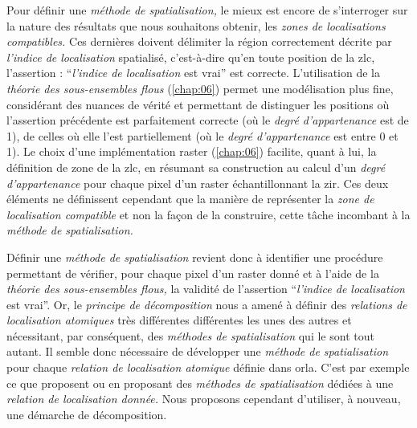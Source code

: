 Pour définir une \emph{méthode de spatialisation,} le mieux est encore
de s’interroger sur la nature des résultats que nous souhaitons
obtenir, les \emph{zones de localisations compatibles.} Ces dernières
doivent délimiter la région correctement décrite par \emph{l'indice de
  localisation} spatialisé, c'est-à-dire qu'en toute position de la
\ac{zlc}, l'assertion : \enquote{\emph{l'indice de localisation} est
  vrai} est correcte. L'utilisation de la \emph{théorie des
  sous-ensembles flous} (\autoref{chap:06}) permet une modélisation
plus fine, considérant des nuances de vérité et permettant de
distinguer les positions où l'assertion précédente est parfaitement
correcte (\ie où le \emph{degré d'appartenance} est de 1), de celles
où elle l'est partiellement (\ie où le \emph{degré d'appartenance} est
entre 0 et 1). Le choix d'une implémentation raster
(\autoref{chap:06}) facilite, quant à lui, la définition de zone de la
\ac{zlc}, en résumant sa construction au calcul d'un \emph{degré
  d'appartenance} pour chaque pixel d'un raster échantillonnant la
\ac{zir}. Ces deux éléments ne définissent cependant que la manière de
représenter la \emph{zone de localisation compatible} et non la façon
de la construire, cette tâche incombant à la \emph{méthode de
  spatialisation.}

Définir une \emph{méthode de spatialisation} revient donc à identifier
une procédure permettant de vérifier, pour chaque pixel d'un raster
donné et à l'aide de la \emph{théorie des sous-ensembles flous,} la
validité de l'assertion \enquote{\emph{l'indice de localisation} est
  vrai}. Or, le \emph{principe de décomposition} nous a amené à
définir des \emph{relations de localisation atomiques} très
différentes différentes les unes des autres et nécessitant, par
conséquent, des \emph{méthodes de spatialisation} qui le sont tout
autant. Il semble donc nécessaire de développer une \emph{méthode de
  spatialisation} pour chaque \emph{relation de localisation atomique}
définie dans \ac{orla}. C'est par exemple ce que proposent
\textcite{Vanegas2011} ou \textcite{Takemura2012} en proposant des
\emph{méthodes de spatialisation} dédiées à une \emph{relation de
  localisation donnée.} Nous proposons cependant d'utiliser, à
nouveau, une démarche de décomposition.

